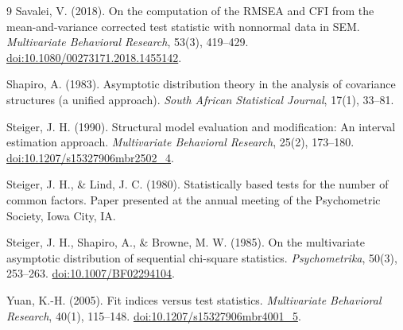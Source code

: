 \documentclass[11pt]{article}
\theoremstyle{plain}
\theoremstyle{remark}
\begin{document}
\begin{thebibliography}{9}
Savalei, V. (2018).
On the computation of the RMSEA and CFI from the mean-and-variance corrected
test statistic with nonnormal data in SEM.
\emph{Multivariate Behavioral Research}, 53(3), 419--429.
\href{https://doi.org/10.1080/00273171.2018.1455142}{doi:10.1080/00273171.2018.1455142}.

Shapiro, A. (1983).
Asymptotic distribution theory in the analysis of covariance structures (a
unified approach).
\emph{South African Statistical Journal}, 17(1), 33--81.

Steiger, J. H. (1990).
Structural model evaluation and modification: An interval estimation approach.
\emph{Multivariate Behavioral Research}, 25(2), 173--180.
\href{https://doi.org/10.1207/s15327906mbr2502_4}{doi:10.1207/s15327906mbr2502\_4}.

Steiger, J. H., \& Lind, J. C. (1980).
Statistically based tests for the number of common factors.
Paper presented at the annual meeting of the Psychometric Society, Iowa City,
IA.

Steiger, J. H., Shapiro, A., \& Browne, M. W. (1985).
On the multivariate asymptotic distribution of sequential chi-square statistics.
\emph{Psychometrika}, 50(3), 253--263.
\href{https://doi.org/10.1007/BF02294104}{doi:10.1007/BF02294104}.

Yuan, K.-H. (2005).
Fit indices versus test statistics.
\emph{Multivariate Behavioral Research}, 40(1), 115--148.
\href{https://doi.org/10.1207/s15327906mbr4001_5}{doi:10.1207/s15327906mbr4001\_5}.

\end{thebibliography}
\end{document}
